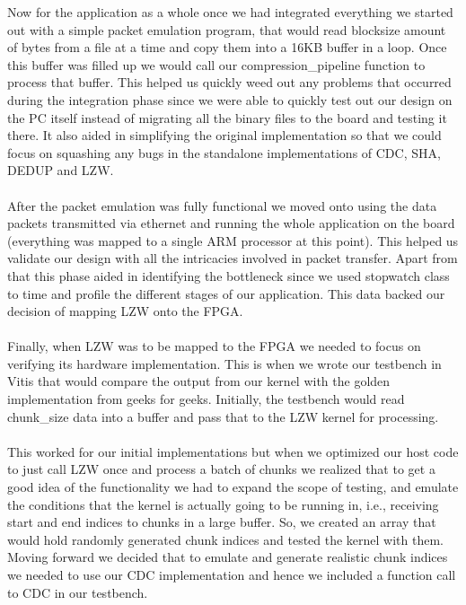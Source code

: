 \documentclass[../main.tex]{subfiles}
\begin{document}
\begin{enumerate}
Now for the application as a whole once we had integrated everything we started out with a simple packet emulation program, that would read blocksize amount of bytes from a file at a time and copy them into a 16KB buffer in a loop. Once this buffer was filled up we would call our compression\_pipeline function to process that buffer. This helped us quickly weed out any problems that occurred during the integration phase since we were able to quickly test out our design on the PC itself instead of migrating all the binary files to the board and testing it there. It also aided in simplifying the original implementation so that we could focus on squashing any bugs in the standalone implementations of CDC, SHA, DEDUP and LZW. \\ \\
After the packet emulation was fully functional we moved onto using the data packets transmitted via ethernet and running the whole application on the board (everything was mapped to a single ARM processor at this point). This helped us validate our design with all the intricacies involved in packet transfer. Apart from that this phase aided in identifying the bottleneck since we used stopwatch class to time and profile the different stages of our application. This data backed our decision of mapping LZW onto the FPGA. \\ \\
Finally, when LZW was to be mapped to the FPGA we needed to focus on verifying its hardware implementation. This is when we wrote our testbench in Vitis that would compare the output from our kernel with the golden implementation from geeks for geeks. Initially, the testbench would read chunk\_size data into a buffer and pass that to the LZW kernel for processing. \\ \\
This worked for our initial implementations but when we optimized our host code to just call LZW once and process a batch of chunks we realized that to get a good idea of the functionality we had to expand the scope of testing, and emulate the conditions that the kernel is actually going to be running in, i.e., receiving start and end indices to chunks in a large buffer. So, we created an array that would hold randomly generated chunk indices and tested the kernel with them. Moving forward we decided that to emulate and generate realistic chunk indices we needed to use our CDC implementation and hence we included a function call to CDC in our testbench. \\ \\

\end{enumerate}
\end{document}
